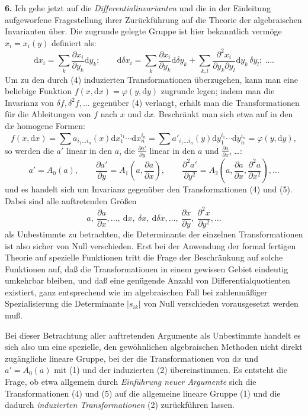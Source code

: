 \documentclass[11pt]{article}
\providecommand{\dd}{\mathrm d}
\begin{document}
\textbf{6.} Ich gehe jetzt auf die \emph{Differentialinvarianten} und die in der Einleitung aufgeworfene Fragestellung ihrer Zurückführung auf die Theorie der algebraischen Invarianten über. Die zugrunde gelegte Gruppe ist hier bekanntlich vermöge $x_i=x_i(y)$ definiert als:
\[
\tag{4}
\dd x_i=\sum_k \frac{\partial x_i}{\partial y_k}\dd y_k;\qquad
\dd\delta x_i=\sum_k \frac{\partial x_i}{\partial y_k}\dd\delta y_k+
\sum_{k,l}\frac{\partial^2 x_i}{\partial y_k\partial y_l}\dd y_k\,\delta y_l;\ \ldots .
\]
Um zu den durch (4) induzierten Transformationen überzugehen, kann man eine beliebige Funktion $f(x,\dd x)=\varphi(y,\dd y)$ zugrunde legen; indem man die Invarianz von $\delta f,\delta^2f,\ldots$ gegenüber (4) verlangt, erhält man die Transformationen für die Ableitungen von $f$ nach $x$ und $\dd x$. Beschränkt man sich etwa auf in den $\dd x$ homogene Formen:
\[
 f(x,\dd x)=\sum a_{i_1\ldots i_n}(x)\dd x_1^{i_1}\cdots\dd x_n^{i_n}
 =\sum a'_{i_1\ldots i_n}(y)\dd y_1^{i_1}\cdots\dd y_n^{i_n}
 =\varphi(y,\dd y),
\]
so werden die $a'$ linear in den $a$, die $\frac{\partial a'}{\partial y}$ linear in den $a$ und $\frac{\partial a}{\partial x}$, \ldots:
\[
\tag{5}
a'=A_0(a),\qquad
\frac{\partial a'}{\partial y}=A_1\!\left(a,\frac{\partial a}{\partial x}\right),\qquad
\frac{\partial^2 a'}{\partial y^2}=A_2\!\left(a,\frac{\partial a}{\partial x},\frac{\partial^2 a}{\partial x^2}\right),\ldots
\]
und es handelt sich um Invarianz gegenüber den Transformationen (4) und (5). Dabei sind alle auftretenden Größen
\[
a,\ \frac{\partial a}{\partial x},\ldots,\ \dd x,\ \delta x,\ \dd\delta x,\ldots,\ 
\frac{\partial x}{\partial y},\ \frac{\partial^2 x}{\partial y^2},\ldots
\]
als Unbestimmte zu betrachten, die Determinante der einzelnen Transformationen ist also sicher von Null verschieden. Erst bei der Anwendung der formal fertigen Theorie auf spezielle Funktionen tritt die Frage der Beschränkung auf solche Funktionen auf, daß die Transformationen in einem gewissen Gebiet eindeutig umkehrbar bleiben, und daß eine genügende Anzahl von Differentialquotienten existiert, ganz entsprechend wie im algebraischen Fall bei zahlenmäßiger Spezialisierung die Determinante $|s_{ik}|$ von Null verschieden vorausgesetzt werden muß.

Bei dieser Betrachtung aller auftretenden Argumente als Unbestimmte handelt es sich also um eine spezielle, den gewöhnlichen algebraischen Methoden nicht direkt zugängliche lineare Gruppe, bei der die Transformationen von $\dd x$ und $a'=A_0(a)$ mit (1) und der induzierten (2) übereinstimmen. Es entsteht die Frage, ob etwa allgemein durch \emph{Einführung neuer Argumente} sich die Transformationen (4) und (5) auf die allgemeine lineare Gruppe (1) und die dadurch \emph{induzierten Transformationen} (2) zurückführen lassen.
\end{document}
